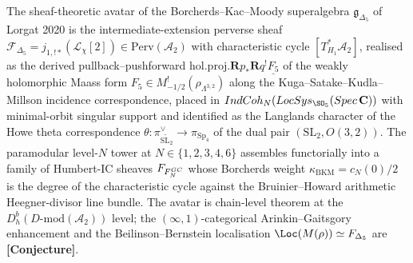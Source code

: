 \documentclass[11pt]{amsart}
\theoremstyle{definition}
\providecommand{\kBKM}{\kappa_{\mathrm{BKM}}}
\providecommand{\IndCoh}{\mathrm{IndCoh}}
\providecommand{\DMod}{D\text{-}\mathrm{mod}}
\providecommand{\Perv}{\mathrm{Perv}}
\providecommand{\LocSys}{\mathrm{LocSys}}
\providecommand{\Sp}{\mathrm{Sp}}
\providecommand{\SL}{\mathrm{SL}}
\providecommand{\cL}{\mathcal{L}}
\providecommand{\cF}{\mathcal{F}}
\providecommand{\bC}{\mathbf{C}}
\providecommand{\bR}{\mathbf{R}}
\providecommand{\holproj}{\mathrm{hol.proj.}}
\providecommand{\Dfive}{\Delta_5}
\providecommand{\gDfive}{\mathfrak{g}_{\Dfive}}
\providecommand{\ClaimStatusConjectured}{\textbf{[Conjecture]}}
\begin{document}
The sheaf-theoretic avatar of the Borcherds--Kac--Moody superalgebra
$\gDfive$ of Lorgat 2020 is the intermediate-extension perverse sheaf
$\cF_{\Dfive} = j_{1,!*}(\cL_\chi[2]) \in \Perv(\mathcal{A}_2)$ with
characteristic cycle $[T^*_{H_1}\mathcal{A}_2]$, realised as the
derived pullback--pushforward $\holproj \bR p_* \bR q^! \underline{F_5}$
of the weakly holomorphic Maass form $F_5 \in M^!_{-1/2}
(\rho_{\Lambda^{3,2}})$ along the Kuga--Satake--Kudla--Millson
incidence correspondence, placed in
$\IndCoh_{\cN}(\LocSys_{\SO_5}(\mathrm{Spec}\,\bC))$ with minimal-orbit
singular support and identified as the Langlands character of the
Howe theta correspondence $\theta \colon \pi^\vee_{\widetilde{\SL_2}}
\to \pi_{\Sp_4}$ of the dual pair $(\SL_2, O(3,2))$. The paramodular
level-$N$ tower at $N \in \{1, 2, 3, 4, 6\}$ assembles functorially
into a family of Humbert-IC sheaves $\cF_{F^{\rm GC}_N}$ whose
Borcherds weight $\kBKM = c_N(0)/2$ is the degree of the
characteristic cycle against the Bruinier--Howard arithmetic
Heegner-divisor line bundle. The avatar is chain-level theorem at
the $D^b_h(\DMod(\mathcal{A}_2))$ level; the $(\infty,1)$-categorical
Arinkin--Gaitsgory enhancement and the Beilinson--Bernstein
localisation $\Loc(M(\rho)) \simeq \cF_{\Dfive}$ are
\ClaimStatusConjectured.
\end{document}

